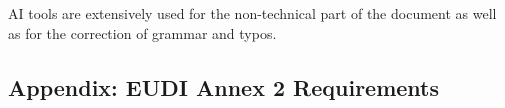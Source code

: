 \documentclass{article}
\begin{document}
AI tools are extensively used for the non-technical part of the document as well as for the correction of grammar and typos.

\clearpage



\clearpage
\begin{landscape}
\section{Appendix: EUDI Annex 2 Requirements}
\label{sec:annex}

\end{landscape}
\end{document}
